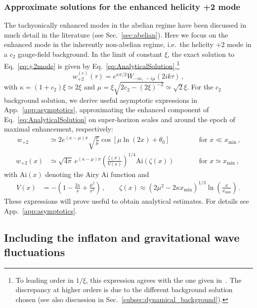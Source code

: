 \subsubsection*{Approximate solutions for the enhanced helicity +2 mode}

The tachyonically enhanced modes in the abelian regime have been discussed in much detail in the literature (see Sec.~\ref{sec:abelian}). Here we focus on the enhanced mode in the inherently non-abelian regime, i.e.\ the helicity $+2$ mode in a $c_2$ gauge-field background.  In the limit of constant $\xi$, the exact solution to Eq.~\eqref{eq:+2mode} is given by Eq.~\eqref{eq:AnalyticalSolution},\footnote{To leading order in $1/\xi$, this expression agrees with the one given in~\cite{Adshead:2013nka}. The discrepancy at higher orders is due to the different background solution chosen (see also discussion in Sec.~\ref{subsec:dynamical_background}).}
\[
w_{+2}^{(e)}(\tau)= e^{\kappa \pi/2} W_{-i\kappa,\,-i\mu}\left(2ik\tau\right) \,,
\label{eq:whittakeragain}
\]
with $\kappa = (1 + c_2) \xi \simeq 2 \xi$ and $\mu = \xi \sqrt{2 c_2 - (2 \xi)^{-2}} \simeq \sqrt{2} \xi$. For the $c_2$ background solution, we derive useful asymptotic expressions in App.~\ref{app:asymptotics}, approximating the enhanced component of Eq.~\eqref{eq:AnalyticalSolution} on super-horizon scales and around the epoch of maximal enhancement, respectively:
\begin{align}
\, w_{+2} & \simeq 2 e^{(\kappa - \mu) \pi} \sqrt{\frac{ x}{ \mu}} \cos\left[\mu \ln(2 x) + \theta_0 \right]  \qquad  &&\text{for   } x \ll  x_\text{min} \,,
 \label{eq:NonabelianAsymptotics}\\
 w_{+2}(x)& \simeq\sqrt{4\pi}\ e^{(\kappa-\mu)\pi}\left(\frac{\zeta(x)}{V(x)}\right)^{1/4}\mathrm{Ai}\left(\zeta(x)\right) \qquad &&\text{for    } x \simeq x_\text{min} \,,
  \label{eq:NonabelianAsymptotics2}
\end{align}
with Ai$(x)$ denoting the Airy Ai function and
\begin{align}
  V(x)  & =-\left(1-\frac{2\kappa}{x}+\frac{\mu^{2}}{x^{2}}\right) \,, \qquad
\zeta(x)\approx\left(2\mu^{2}-2\kappa x_\text{min}\right)^{1/3}\ln\left(\frac{x}{x_\text{min}}\right) \,.
\label{eq:Airyapp}
 \end{align}
These expressions will prove useful to obtain analytical estimates. For details see App.~\ref{app:asymptotics}.

 
 \subsection{Including the inflaton and gravitational wave fluctuations \label{sec:AllFluc}}
 
